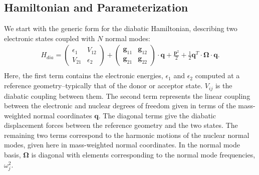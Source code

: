 
\subsection{Hamiltonian and Parameterization}

We start with the  generic form for the diabatic Hamiltonian, describing two electronic states coupled with $N$ normal modes:
\begin{eqnarray}
H_{dia}=\left(\begin{array}{cc}
\epsilon_{1} & V_{12}\\
V_{21} & \epsilon_{2}
\end{array}\right)
+\left(\begin{array}{cc}
{\mathbf g}_{11}&{\mathbf g}_{12} \\
{\mathbf g}_{21} &{\mathbf g}_{22}
\end{array}\right)\cdot{\mathbf q} +\frac{{\mathbf p}^{2}}{2}+\frac{1}{2}\mathbf{q}^{T}\cdot\mathbf\Omega\cdot\mathbf{q}.
\nonumber \\
\end{eqnarray}
Here, the first term contains the electronic energies, $\epsilon_{1}$ and $\epsilon_{2}$ computed at a
reference geometry--typically that of the donor or acceptor state. $V_{ij}$ is the diabatic coupling between them.  The second term represents the
linear coupling between the electronic and nuclear degrees of freedom given in terms of the mass-weighted
normal coordinates $\mathbf q$.   The diagonal terms
give the diabatic displacement forces between the reference geometry and the two states.
The remaining two terms correspond to the harmonic motions of the nuclear normal modes, given here in mass-weighted normal coordinates.
In the normal mode basis, $\mathbf \Omega$  is diagonal with elements corresponding to the normal mode frequencies, $\omega_{j}^{2}$.

